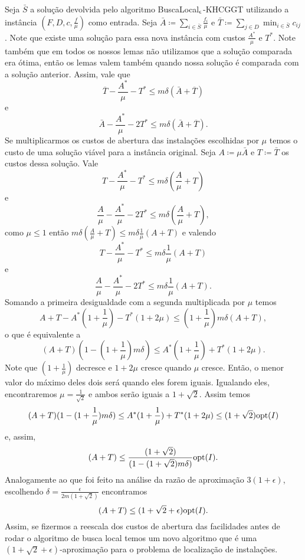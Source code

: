 Seja $\bar{S}$ a solução devolvida pelo algoritmo {\sc BuscaLocal$_\epsilon$-KHCGGT} utilizando a instância $(F,D,c,\frac{f}{\mu})$ como entrada. Seja $\bar{A} \coloneqq \sum_{i \in \bar{S}} \frac{f_i}{\mu}$ e $\bar{T} \coloneqq \sum_{j\in D} \min_{i \in \bar{S}} c_{ij}$. Note que existe uma solução para essa nova instância com custos $\frac{A^*}{\mu}$ e $T^*$. Note também que em todos os nossos lemas não utilizamos  que a solução comparada era ótima, então os lemas valem também quando nossa solução é comparada com a solução anterior. Assim, vale que
\[ \overline{T} - \frac{A^*}{\mu} - T^* \leq m\delta(\bar{A} + \overline{T})\]
e
\[ \bar{A} - \frac{A^*}{\mu} - 2T^* \leq m\delta(\bar{A} + \overline{T}).\]
Se multiplicarmos os custos de abertura das instalações escolhidas por $\mu$ temos o custo de uma solução viável para a instância original. Seja $A \coloneqq \mu\bar{A}$ e $T \coloneqq \bar{T}$ os custos dessa solução. Vale
\[ T - \frac{A^*}{\mu} - T^* \leq m\delta(\frac{A}{\mu}+ T)\]
e
\[ \frac{A}{\mu} - \frac{A^*}{\mu} - 2T^* \leq m\delta(\frac{A}{\mu} + T),\]
como $\mu \leq 1$ então $m\delta(\frac{A}{\mu}+ T) \leq m\delta\frac{1}{\mu}( A + T)$ e valendo 
\[T - \frac{A^*}{\mu} - T^* \leq m\delta\frac{1}{\mu}( A + T) \] 
e 
\[ \frac{A}{\mu} - \frac{A^*}{\mu} - 2T^* \leq m\delta\frac{1}{\mu}( A + T) .\]
Somando a primeira desigualdade com a segunda multiplicada por $\mu$ temos
\[A + T - A^* (1 + \frac{1}{\mu}) - T^*(1 + 2\mu) \leq (1 + \frac{1}{\mu})m\delta(A+T),\]
o que é equivalente a 
\[(A+T)(1 - (1+\frac{1}{\mu})m\delta)\leq A^* (1 + \frac{1}{\mu}) + T^*(1 + 2\mu).\]
Note que $(1+\frac{1}{\mu})$ decresce e $1 + 2\mu$ cresce quando $\mu$ cresce. Então, o menor valor do máximo deles dois será quando eles forem iguais. Igualando eles, encontraremos $\mu = \frac{1}{\sqrt{2}}$ e ambos serão iguais a $1 + \sqrt{2}$. Assim temos
\[(A+T)(1 - (1+\frac{1}{\mu})m\delta)\leq A^* (1 + \frac{1}{\mu}) + T^*(1 + 2\mu) \leq (1+\sqrt{2})\mathrm{opt}(I)\]
e, assim, 
\[(A+T)\leq \frac{(1+\sqrt{2})}{(1 - (1+\sqrt{2 })m\delta)}\mathrm{opt}(I).\]
Analogamente ao que foi feito na análise da razão de aproximação $3(1 + \epsilon)$, escolhendo $\delta = \frac{\epsilon}{2m(1+\sqrt{2})}$ encontramos 
\[(A+T) \leq (1 + \sqrt{2} + \epsilon )\mathrm{opt}(I).\]
Assim, se fizermos a reescala dos custos de abertura das facilidades antes de rodar o algoritmo de busca local temos um novo algoritmo que é uma $(1 + \sqrt{2} + \epsilon )$-aproximação para o problema de localização de instalações.